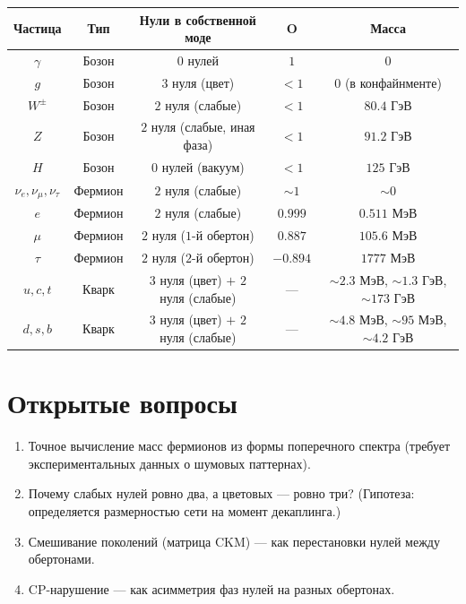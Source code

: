 \documentclass[11pt,a4paper]{article}
\theoremstyle{definition}
\begin{document}
\begin{center}
\begin{tabular}{c|c|c|c|c}
\textbf{Частица} & \textbf{Тип} & \textbf{Нули в собственной моде} & \textbf{O} & \textbf{Масса} \\
\hline
$\gamma$ & Бозон & $0$ нулей & $1$ & $0$ \\
$g$ & Бозон & $3$ нуля (цвет) & $<1$ & $0$ (в конфайнменте) \\
$W^\pm$ & Бозон & $2$ нуля (слабые) & $<1$ & $80.4$ ГэВ \\
$Z$ & Бозон & $2$ нуля (слабые, иная фаза) & $<1$ & $91.2$ ГэВ \\
$H$ & Бозон & $0$ нулей (вакуум) & $<1$ & $125$ ГэВ \\
$\nu_e, \nu_\mu, \nu_\tau$ & Фермион & $2$ нуля (слабые) & $\sim 1$ & $\sim 0$ \\
$e$ & Фермион & $2$ нуля (слабые) & $0.999$ & $0.511$ МэВ \\
$\mu$ & Фермион & $2$ нуля ($1$-й обертон) & $0.887$ & $105.6$ МэВ \\
$\tau$ & Фермион & $2$ нуля ($2$-й обертон) & $-0.894$ & $1777$ МэВ \\
$u, c, t$ & Кварк & $3$ нуля (цвет) $+$ $2$ нуля (слабые) & — & $\sim 2.3$ МэВ, $\sim 1.3$ ГэВ, $\sim 173$ ГэВ \\
$d, s, b$ & Кварк & $3$ нуля (цвет) $+$ $2$ нуля (слабые) & — & $\sim 4.8$ МэВ, $\sim 95$ МэВ, $\sim 4.2$ ГэВ
\end{tabular}
\end{center}

\section{Открытые вопросы}

\begin{enumerate}
    \item Точное вычисление масс фермионов из формы поперечного спектра (требует экспериментальных данных о шумовых паттернах).
    \item Почему слабых нулей ровно два, а цветовых — ровно три? (Гипотеза: определяется размерностью сети на момент декаплинга.)
    \item Смешивание поколений (матрица CKM) — как перестановки нулей между обертонами.
    \item CP-нарушение — как асимметрия фаз нулей на разных обертонах.
\end{enumerate}
\end{document}

